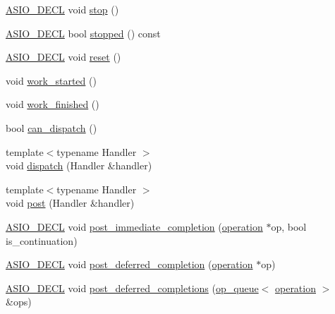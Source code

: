 \begin{DoxyCompactItemize}
\item 
\hyperlink{config_8hpp_ab54d01ea04afeb9a8b39cfac467656b7}{A\+S\+I\+O\+\_\+\+D\+E\+C\+L} void \hyperlink{classasio_1_1detail_1_1task__io__service_a4dd3dd048d2ea638639b97bebc535993}{stop} ()
\item 
\hyperlink{config_8hpp_ab54d01ea04afeb9a8b39cfac467656b7}{A\+S\+I\+O\+\_\+\+D\+E\+C\+L} bool \hyperlink{classasio_1_1detail_1_1task__io__service_a495af480280c9ec23371a96ec688e2dc}{stopped} () const 
\item 
\hyperlink{config_8hpp_ab54d01ea04afeb9a8b39cfac467656b7}{A\+S\+I\+O\+\_\+\+D\+E\+C\+L} void \hyperlink{classasio_1_1detail_1_1task__io__service_a4682169fee932755fac3bef2215b5062}{reset} ()
\item 
void \hyperlink{classasio_1_1detail_1_1task__io__service_a4d0f616df81276a3e694579a490950c4}{work\+\_\+started} ()
\item 
void \hyperlink{classasio_1_1detail_1_1task__io__service_a39e0635c3435891f399103fea79651ea}{work\+\_\+finished} ()
\item 
bool \hyperlink{classasio_1_1detail_1_1task__io__service_aa6c35cf775e3b2cfa27f41de6939ece9}{can\+\_\+dispatch} ()
\item 
{\footnotesize template$<$typename Handler $>$ }\\void \hyperlink{classasio_1_1detail_1_1task__io__service_a235acc38631029c8d2f63024c3236af6}{dispatch} (Handler \&handler)
\item 
{\footnotesize template$<$typename Handler $>$ }\\void \hyperlink{classasio_1_1detail_1_1task__io__service_ae36df3acc067c7181927ac125fb615ef}{post} (Handler \&handler)
\item 
\hyperlink{config_8hpp_ab54d01ea04afeb9a8b39cfac467656b7}{A\+S\+I\+O\+\_\+\+D\+E\+C\+L} void \hyperlink{classasio_1_1detail_1_1task__io__service_a702211c6c77ac1343d33ae7874605645}{post\+\_\+immediate\+\_\+completion} (\hyperlink{classasio_1_1detail_1_1task__io__service_abb8a2a1b24b3cbf9afd8d19bf4bd6929}{operation} $\ast$op, bool is\+\_\+continuation)
\item 
\hyperlink{config_8hpp_ab54d01ea04afeb9a8b39cfac467656b7}{A\+S\+I\+O\+\_\+\+D\+E\+C\+L} void \hyperlink{classasio_1_1detail_1_1task__io__service_ab2d10a452969b826c725913d582b7603}{post\+\_\+deferred\+\_\+completion} (\hyperlink{classasio_1_1detail_1_1task__io__service_abb8a2a1b24b3cbf9afd8d19bf4bd6929}{operation} $\ast$op)
\item 
\hyperlink{config_8hpp_ab54d01ea04afeb9a8b39cfac467656b7}{A\+S\+I\+O\+\_\+\+D\+E\+C\+L} void \hyperlink{classasio_1_1detail_1_1task__io__service_a371b4e1a6f3a20777a0857332f38d869}{post\+\_\+deferred\+\_\+completions} (\hyperlink{classasio_1_1detail_1_1op__queue}{op\+\_\+queue}$<$ \hyperlink{classasio_1_1detail_1_1task__io__service_abb8a2a1b24b3cbf9afd8d19bf4bd6929}{operation} $>$ \&ops)

\end{DoxyCompactItemize}
